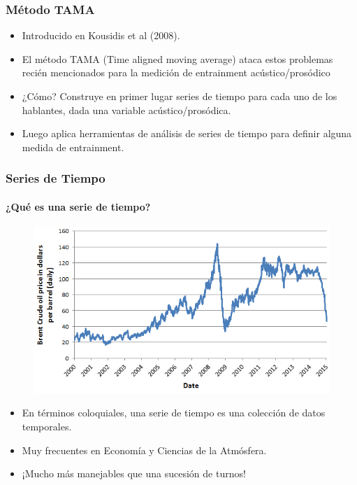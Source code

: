 \begin{frame}
  \frametitle{Método TAMA}
  \begin{itemize}
    \item Introducido en Kousidis et al (2008).
    \item El método TAMA (Time aligned moving average) ataca estos problemas recién mencionados para la medición de entrainment acústico/prosódico
    \item ¿Cómo? Construye en primer lugar series de tiempo para cada uno de los hablantes, dada una variable acústico/prosódica.
    \item Luego aplica herramientas de análisis de series de tiempo para definir alguna medida de entrainment.
  \end{itemize}
\end{frame}


\begin{frame}
  \frametitle{Series de Tiempo}
  \framesubtitle{¿Qué es una serie de tiempo?}

  \begin{figure}[t]
    \includegraphics[scale=0.35]{images/oil_price.jpg}
  \end{figure}

  \begin{itemize}
     \item En términos coloquiales, una serie de tiempo es una colección de datos temporales.
     \item Muy frecuentes en Economía y Ciencias de la Atmósfera.
     \item ¡Mucho más manejables que una sucesión de turnos!
   \end{itemize}
\end{frame}




